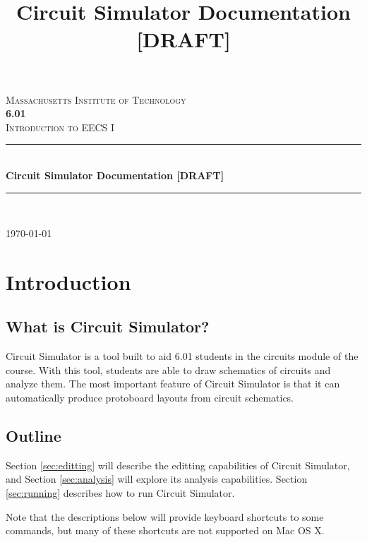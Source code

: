 \documentclass[12pt]{amsart}
\title{Circuit Simulator Documentation [DRAFT]}
\newcommand{\HRule}{\rule{\linewidth}{0.5mm}}
\begin{document}
\begin{titlepage}
\begin{center}

\textsc{\LARGE Massachusetts Institute of Technology}\\[1.5cm]

\textsc{\Large \bfseries 6.01}\\
\textsc{\Large Introduction to EECS I}\\[2.5cm]

\HRule \\[0.4cm]
{ \huge \bfseries Circuit Simulator Documentation [DRAFT]}\\[0.4cm]
\HRule \\[1.5cm]

\vfill

{\large \today}

\end{center}
\end{titlepage}

\maketitle

\tableofcontents

\section{Introduction}

\subsection{What is  Circuit Simulator?}

Circuit Simulator is a tool built to aid 6.01 students in the circuits module of the course. With this tool, students are able to draw schematics of circuits and analyze them. The most important feature of Circuit Simulator is that it can automatically produce protoboard layouts from circuit schematics.

\subsection{Outline}

Section \ref{sec:editting} will describe the editting capabilities of Circuit Simulator, and Section \ref{sec:analysis} will explore its analysis capabilities. Section \ref{sec:running} describes how to run Circuit Simulator.

Note that the descriptions below will provide keyboard shortcuts to some commands, but many of these shortcuts are not supported on Mac OS X.
\end{document}
